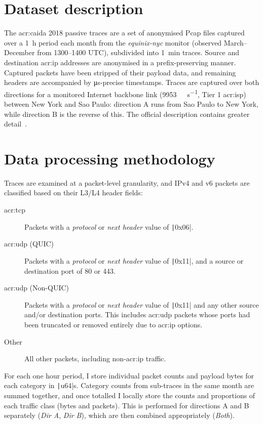 \section{Dataset description}
The \gls{acr:caida} 2018 passive traces are a set of anonymised Pcap files captured over a \qty{1}{\hour} period each month from the \emph{equinix-nyc} monitor (observed March--December from 1300--1400 UTC), subdivided into \qty{1}{\minute} traces.
Source and destination \gls{acr:ip} addresses are anonymised in a prefix-preserving manner.
Captured packets have been stripped of their payload data, and remaining headers are accompanied by \unit{\micro\second}-precise timestamps.
Traces are captured over both directions for a monitored Internet backbone link (\qty{9953}{\mega\bit\per\second}, Tier 1 \gls{acr:isp}) between New York and Sao Paulo: direction A runs from Sao Paulo to New York, while direction B is the reverse of this.
The official description contains greater detail~\parencite{caida-2018-passive}.

\section{Data processing methodology}
Traces are examined at a packet-level granularity, and IPv4 and v6 packets are classified based on their L3/L4 header fields:
\begin{description}
	\item[\gls{acr:tcp}] Packets with a \emph{protocol} or \emph{next header} value of \texttt|0x06|.
	\item[\gls{acr:udp} (QUIC)] Packets with a \emph{protocol} or \emph{next header} value of \texttt|0x11|, and a source or destination port of 80 or 443.
	\item[\gls{acr:udp} (Non-QUIC)] Packets with a \emph{protocol} or \emph{next header} value of \texttt|0x11| and any other source and/or destination ports. This includes \gls{acr:udp} packets whose ports had been truncated or removed entirely due to \gls{acr:ip} options.
	\item[Other] All other packets, including non-\gls{acr:ip} traffic.
\end{description}
For each one hour period, I store individual packet counts and payload bytes for each category in \texttt|u64|s.
Category counts from sub-traces in the same month are summed together, and once totalled I locally store the counts and proportions of each traffic class (bytes and packets).
This is performed for directions A and B separately (\emph{Dir A}, \emph{Dir B}), which are then combined appropriately (\emph{Both}).

